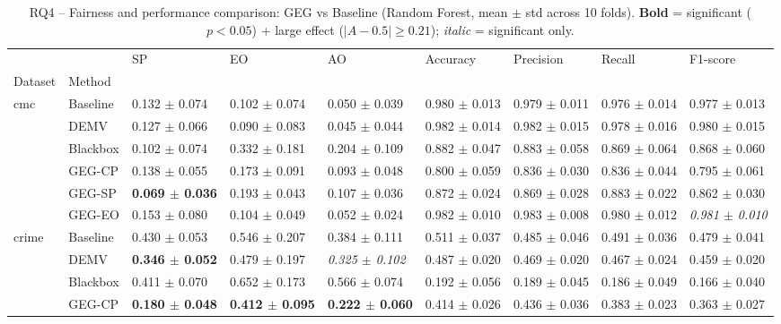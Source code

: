 \begin{table}
\caption{RQ4 -- Fairness and performance comparison: GEG vs Baseline (Random Forest, mean $\pm$ std across 10 folds). \textbf{Bold} = significant ($p{<}0.05$) + large effect ($|A{-}0.5|{\geq}0.21$); \textit{italic} = significant only.}
\label{tab:rq4_rf}
\begin{tabular}{lllllllll}
\toprule
 &  & SP & EO & AO & Accuracy & Precision & Recall & F1-score \\
Dataset & Method &  &  &  &  &  &  &  \\
\midrule
\multirow[t]{6}{*}{cmc} & Baseline & 0.132 $\pm$ 0.074 & 0.102 $\pm$ 0.074 & 0.050 $\pm$ 0.039 & 0.980 $\pm$ 0.013 & 0.979 $\pm$ 0.011 & 0.976 $\pm$ 0.014 & 0.977 $\pm$ 0.013 \\
 & DEMV & 0.127 $\pm$ 0.066 & 0.090 $\pm$ 0.083 & 0.045 $\pm$ 0.044 & 0.982 $\pm$ 0.014 & 0.982 $\pm$ 0.015 & 0.978 $\pm$ 0.016 & 0.980 $\pm$ 0.015 \\
 & Blackbox & 0.102 $\pm$ 0.074 & 0.332 $\pm$ 0.181 & 0.204 $\pm$ 0.109 & 0.882 $\pm$ 0.047 & 0.883 $\pm$ 0.058 & 0.869 $\pm$ 0.064 & 0.868 $\pm$ 0.060 \\
 & GEG-CP & 0.138 $\pm$ 0.055 & 0.173 $\pm$ 0.091 & 0.093 $\pm$ 0.048 & 0.800 $\pm$ 0.059 & 0.836 $\pm$ 0.030 & 0.836 $\pm$ 0.044 & 0.795 $\pm$ 0.061 \\
 & GEG-SP & \textbf{0.069 $\pm$ 0.036} & 0.193 $\pm$ 0.043 & 0.107 $\pm$ 0.036 & 0.872 $\pm$ 0.024 & 0.869 $\pm$ 0.028 & 0.883 $\pm$ 0.022 & 0.862 $\pm$ 0.030 \\
 & GEG-EO & 0.153 $\pm$ 0.080 & 0.104 $\pm$ 0.049 & 0.052 $\pm$ 0.024 & 0.982 $\pm$ 0.010 & 0.983 $\pm$ 0.008 & 0.980 $\pm$ 0.012 & \textit{0.981 $\pm$ 0.010} \\
\cline{1-9}
\multirow[t]{6}{*}{crime} & Baseline & 0.430 $\pm$ 0.053 & 0.546 $\pm$ 0.207 & 0.384 $\pm$ 0.111 & 0.511 $\pm$ 0.037 & 0.485 $\pm$ 0.046 & 0.491 $\pm$ 0.036 & 0.479 $\pm$ 0.041 \\
 & DEMV & \textbf{0.346 $\pm$ 0.052} & 0.479 $\pm$ 0.197 & \textit{0.325 $\pm$ 0.102} & 0.487 $\pm$ 0.020 & 0.469 $\pm$ 0.020 & 0.467 $\pm$ 0.024 & 0.459 $\pm$ 0.020 \\
 & Blackbox & 0.411 $\pm$ 0.070 & 0.652 $\pm$ 0.173 & 0.566 $\pm$ 0.074 & 0.192 $\pm$ 0.056 & 0.189 $\pm$ 0.045 & 0.186 $\pm$ 0.049 & 0.166 $\pm$ 0.040 \\
 & GEG-CP & \textbf{0.180 $\pm$ 0.048} & \textbf{0.412 $\pm$ 0.095} & \textbf{0.222 $\pm$ 0.060} & 0.414 $\pm$ 0.026 & 0.436 $\pm$ 0.036 & 0.383 $\pm$ 0.023 & 0.363 $\pm$ 0.027 \\

\end{tabular}
\end{table}
